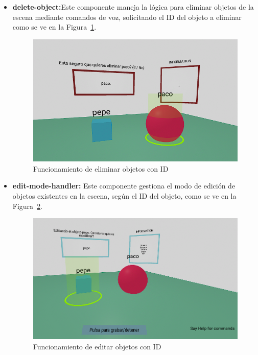 \documentclass[a4paper, 12pt]{book}
\begin{document}
\begin{itemize}
  \item \textbf{delete-object:}Este componente maneja la lógica para eliminar objetos de la escena mediante comandos de voz, solicitando el ID del objeto a eliminar como se ve en la Figura~\ref{fig:eliminarObj}.
  \begin{figure}[H]  %
    \centering
    \includegraphics[width=0.6\linewidth]{img/generador_funcional_completo_eliminar.png}  %
    \caption{Funcionamiento de eliminar objetos con ID}  %
    \label{fig:eliminarObj}  %
  \end{figure} 

  \item \textbf{edit-mode-handler:} Este componente gestiona el modo de edición de objetos existentes en la escena, según el ID del objeto, como se ve en la Figura~\ref{fig:editarObj}.
  \begin{figure}[H]  %
    \centering
    \includegraphics[width=0.6\linewidth]{img/generador_funcional_completo_editar.png}  %
    \caption{Funcionamiento de editar objetos con ID}  %
    \label{fig:editarObj}  %
  \end{figure} 



\end{itemize}
\end{document}
